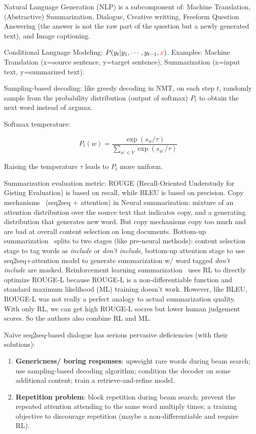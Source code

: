 Natural Language Generation (NLP) is a subcomponent of: Machine Translation, (Abstractive) Summarization, Dialogue, Creative writting, Freeform Question Answering (the answer is not the raw part of the question but a newly generated text), and Image captioning.

Conditional Language Modeling: $P(y_t | y_1, \cdots, y_{t-1}, \textcolor{red}{x})$.
Examples: Machine Translation (x=source sentence, y=target sentence), Summarization (x=input text, y=summarized text).

Sampling-based decoding: like greedy decoding in NMT, on each step $t$, randomly sample from the probability distribution (output of softmax) $P_t$ to obtain the next word instead of argmax.

Softmax temperature:

\begin{equation}
	P_t(w) = \frac{\exp (s_w / \tau)}{\sum_{w^\prime \in V} \exp (s_{w^\prime} / \tau)}
\end{equation}

Raising the temperature $\tau$ leads to $P_t$ more uniform.

Summarization evaluation metric: ROUGE (Recall-Oriented Understudy for Gisting Evaluation) is based on recall, while BLEU is based on precision.
Copy mechanisms~ (seq2seq + attention) in Neural summarization: mixture of an attention distribution over the source text that indicates copy, and a generating distribution that generates new word.
But copy mechanisms copy too much and are bad at overall content selection on long documents.
Bottom-up summarization~ splits to two stages (like pre-neural methods): content selection stage to tag words as \textit{include} or \textit{don't include}, bottom-up attention stage to use seq2seq+attention model to generate summarization w/ word tagged \textit{don't include} are masked.
Reinforcement learning summarization~ uses RL to directly optimize ROUGE-L because ROUGE-L is a non-differentiable function and standard maximum likelihood (ML) training doesn't work.
However, like BLEU, ROUGE-L was not really a perfect analogy to actual summarization quality.
With only RL, we can get high ROUGE-L socres but lower human judgement scores.
So the authors also combine RL and ML.

Na\"ive seq2seq-based dialogue has serious pervasive deficiencies (with their solutions): 

\begin{enumerate}
	\item \textbf{Genericness/ boring responses}: upweight rare words during beam search; use sampling-based decoding algorithm; condition the decoder on some additional content; train a retrieve-and-refine model.
	\item \textbf{Repetition problem}: block repetition during beam search; prevent the repeated attention attending to the same word multiply times; a training objective to discourage repetition (maybe a non-differentiable and require RL).
\end{enumerate}

